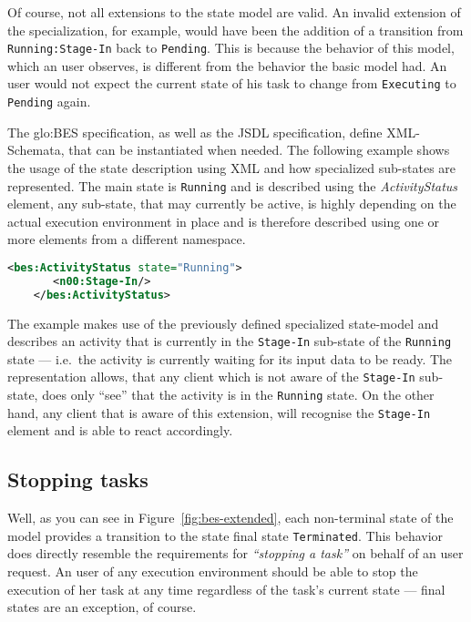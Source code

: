 Of course,  not all extensions to  the state model are  valid.  An invalid
extension of the specialization, for example, would have been the addition
of a  transition from \texttt{Running:Stage-In}  back to \texttt{Pending}.
This is  because the behavior  of this model,  which an user  observes, is
different from the behavior the basic  model had. An user would not expect
the  current  state of  his  task  to  change from  \texttt{Executing}  to
\texttt{Pending} again.

The \gls{glo:BES} specification, as well as the JSDL specification, define
XML-Schemata, that can be instantiated when needed.  The following example
shows the  usage of  the state description  using XML and  how specialized
sub-states  are represented.  The  main state  is \texttt{Running}  and is
described using the \emph{ActivityStatus} element, any sub-state, that may
currently  be  active,  is   highly  depending  on  the  actual  execution
environment in place and is therefore described using one or more elements
from a different namespace.

\begin{minipage}{0.75\textwidth}
  \begin{lstlisting}[language=XML]
    <bes:ActivityStatus state="Running">
       <n00:Stage-In/>
    </bes:ActivityStatus>
  \end{lstlisting}
\end{minipage}

The example  makes use of  the previously defined  specialized state-model
and  describes an  activity  that is  currently  in the  \texttt{Stage-In}
sub-state of the \texttt{Running} state --- i.e.~the activity is currently
waiting for its  input data to be ready.   The representation allows, that
any client  which is  not aware of  the \texttt{Stage-In}  sub-state, does
only ``see''  that the activity is  in the \texttt{Running}  state. On the
other hand, any client that is aware of this extension, will recognise the
\texttt{Stage-In} element and is able to react accordingly.


\subsection{Stopping tasks}
\label{sec:stopping-task}

Well, as  you can see in  Figure~\ref{fig:bes-extended}, each non-terminal
state  of  the  model provides  a  transition  to  the state  final  state
\texttt{Terminated}. This behavior does directly resemble the requirements
for \emph{``stopping a  task''} on behalf of an user  request.  An user of
any execution environment should be able to stop the execution of her task
at any time regardless of the task's current state --- final states are an
exception, of course.

